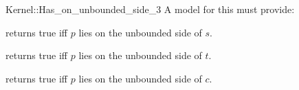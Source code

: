 \begin{ccRefFunctionObjectConcept}{Kernel::Has_on_unbounded_side_3}
A model for this must provide:


{returns true iff $p$ lies on the unbounded side of $s$.}

{returns true iff $p$ lies on the unbounded side of $t$.}

{returns true iff $p$ lies on the unbounded side of $c$.}

\end{ccRefFunctionObjectConcept}
